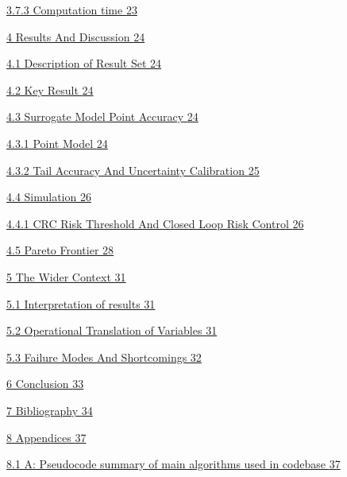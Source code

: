 \documentclass[11pt]{article}
\begin{document}
\hyperref[computation-time]{3.7.3 Computation time
\hyperref[computation-time]{23}}

\hyperref[results-and-discussion]{4 Results And Discussion
\hyperref[results-and-discussion]{24}}

\hyperref[description-of-result-set]{4.1 Description of Result Set
\hyperref[description-of-result-set]{24}}

\hyperref[key-result]{4.2 Key Result \hyperref[key-result]{24}}

\hyperref[surrogate-model-point-accuracy]{4.3 Surrogate Model Point
Accuracy \hyperref[surrogate-model-point-accuracy]{24}}

\hyperref[point-model]{4.3.1 Point Model \hyperref[point-model]{24}}

\hyperref[tail-accuracy-and-uncertainty-calibration]{4.3.2 Tail Accuracy
And Uncertainty Calibration
\hyperref[tail-accuracy-and-uncertainty-calibration]{25}}

\hyperref[simulation]{4.4 Simulation \hyperref[simulation]{26}}

\hyperref[crc-risk-threshold-and-closed-loop-risk-control]{4.4.1 CRC
Risk Threshold And Closed Loop Risk Control
\hyperref[crc-risk-threshold-and-closed-loop-risk-control]{26}}

\hyperref[pareto-frontier]{4.5 Pareto Frontier
\hyperref[pareto-frontier]{28}}

\hyperref[the-wider-context]{5 The Wider Context
\hyperref[the-wider-context]{31}}

\hyperref[interpretation-of-results]{5.1 Interpretation of results
\hyperref[interpretation-of-results]{31}}

\hyperref[operational-translation-of-variables]{5.2 Operational
Translation of Variables
\hyperref[operational-translation-of-variables]{31}}

\hyperref[failure-modes-and-shortcomings]{5.3 Failure Modes And
Shortcomings \hyperref[failure-modes-and-shortcomings]{32}}

\hyperref[conclusion]{6 Conclusion \hyperref[conclusion]{33}}

\hyperref[bibliography]{7 Bibliography \hyperref[bibliography]{34}}

\hyperref[appendices]{8 Appendices \hyperref[appendices]{37}}

\hyperref[a-pseudocode-summary-of-main-algorithms-used-in-codebase]{8.1
A: Pseudocode summary of main algorithms used in codebase
\hyperref[a-pseudocode-summary-of-main-algorithms-used-in-codebase]{37}}
\end{document}
